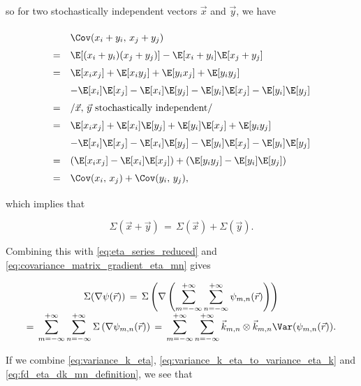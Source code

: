 {so for two stochastically independent vectors $\vec{x}$ and $\vec{y}$, we have

\begin{equation}
\renewcommand*{\arraystretch}{1.5}
\begin{array}{cl}
  & \Cov(x_i+y_i,\,x_j+y_j) \\
= & \E[(x_i+y_i)(x_j+y_j)] - \E[x_i+y_i]\E[x_j+y_j] \\
= & \E[x_i x_j] + \E[x_i y_j] + \E[y_i x_j] + \E[y_i y_j] \\
  & - \E[x_i]\E[x_j] - \E[x_i]\E[y_j] - \E[y_i]\E[x_j] - \E[y_i]\E[y_j] \\
= & \left/ \vec{x},\, \vec{y}\ \text{stochastically independent}\right/ \\
= & \E[x_i x_j] + \E[x_i]\E[y_j] + \E[y_i]\E[x_j] + \E[y_i y_j] \\
  & - \E[x_i]\E[x_j] - \E[x_i]\E[y_j] - \E[y_i]\E[x_j] - \E[y_i]\E[y_j] \\
= & (\E[x_i x_j] - \E[x_i]\E[x_j]) + (\E[y_i y_j] - \E[y_i]\E[y_j]) \\
= & \Cov(x_i,\,x_j) + \Cov(y_i,\,y_j),
\end{array}
\end{equation}

which implies that

\begin{equation} \label{eq:covariance_matrix_sum}
\Sigma(\vec{x} + \vec{y}) \,=\, \Sigma(\vec{x}) + \Sigma(\vec{y}).
\end{equation}

Combining this with \eqref{eq:eta_series_reduced} and \eqref{eq:covariance_matrix_gradient_eta_mn} gives

\begin{equation} \label{eq:covariance_matrix_gradient_eta}
\renewcommand*{\arraystretch}{2}
\begin{array}{c}
\displaystyle \Sigma(\nabla\psi(\vec{r})) \,=\, \Sigma\left(\nabla\left(\sum_{m=-\infty}^{+\infty}\sum_{n=-\infty}^{+\infty} \psi_{m,n}(\vec{r})\right)\right) \\
\displaystyle =\, \sum_{m=-\infty}^{+\infty}\sum_{n=-\infty}^{+\infty}\Sigma\left(\nabla\psi_{m,n}(\vec{r})\right) \,=\, \sum_{m=-\infty}^{+\infty}\sum_{n=-\infty}^{+\infty}\vec{k}_{m,n}\otimes\vec{k}_{m,n} \Var(\psi_{m,n}(\vec{r})).
\end{array}
\end{equation}

If we combine \eqref{eq:variance_k_eta}, \eqref{eq:variance_k_eta_to_variance_eta_k} and \eqref{eq:fd_eta_dk_mn_definition}, we see that

}

